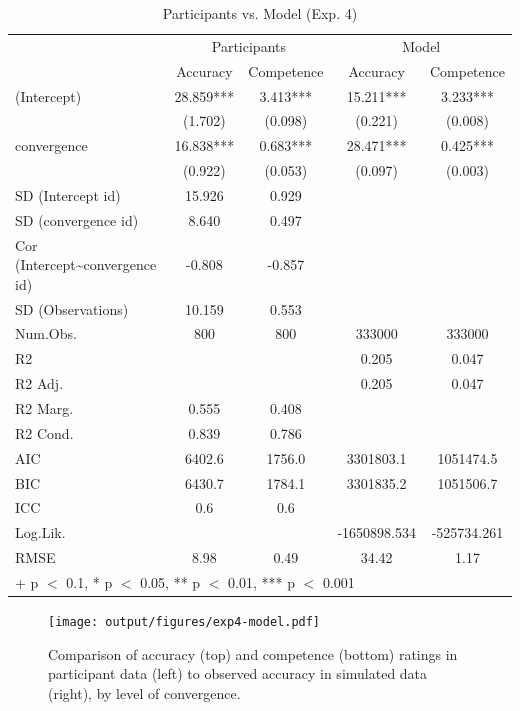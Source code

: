 \documentclass[
  doc,floatsintext]{apa6}
\begin{document}
\begin{table}
\centering
\caption{\label{tab:model-vs-participant-table}Participants vs. Model (Exp. 4)}
\centering
\begin{tabular}[t]{lcccc}
\toprule
\multicolumn{1}{c}{ } & \multicolumn{2}{c}{Participants} & \multicolumn{2}{c}{Model} \\
\cmidrule(l{3pt}r{3pt}){2-3} \cmidrule(l{3pt}r{3pt}){4-5}
  & Accuracy & Competence & Accuracy  & Competence \\
\midrule
(Intercept) & 28.859*** & 3.413*** & 15.211*** & 3.233***\\
 & (1.702) & (0.098) & (0.221) & (0.008)\\
convergence & 16.838*** & 0.683*** & 28.471*** & 0.425***\\
 & (0.922) & (0.053) & (0.097) & (0.003)\\
SD (Intercept id) & 15.926 & 0.929 &  & \\
SD (convergence id) & 8.640 & 0.497 &  & \\
Cor (Intercept\textasciitilde{}convergence id) & -0.808 & -0.857 &  & \\
SD (Observations) & 10.159 & 0.553 &  & \\
\midrule
Num.Obs. & 800 & 800 & 333000 & 333000\\
R2 &  &  & 0.205 & 0.047\\
R2 Adj. &  &  & 0.205 & 0.047\\
R2 Marg. & 0.555 & 0.408 &  & \\
R2 Cond. & 0.839 & 0.786 &  & \\
AIC & 6402.6 & 1756.0 & 3301803.1 & 1051474.5\\
BIC & 6430.7 & 1784.1 & 3301835.2 & 1051506.7\\
ICC & 0.6 & 0.6 &  & \\
Log.Lik. &  &  & -1650898.534 & -525734.261\\
RMSE & 8.98 & 0.49 & 34.42 & 1.17\\
\bottomrule
\multicolumn{5}{l}{\rule{0pt}{1em}+ p $<$ 0.1, * p $<$ 0.05, ** p $<$ 0.01, *** p $<$ 0.001}\\
\end{tabular}
\end{table}



\begin{figure}
\centering
\texttt{[image: output/figures/exp4-model.pdf]}
\caption{\label{fig:exp4-model}Comparison of accuracy (top) and competence (bottom) ratings in participant data (left) to observed accuracy in simulated data (right), by level of convergence.}
\end{figure}
\end{document}
